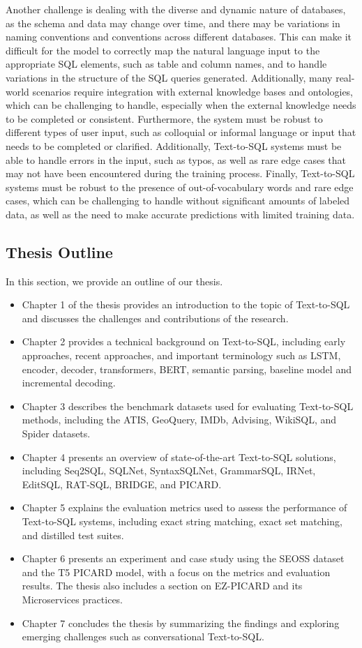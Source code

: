 Another challenge is dealing with the diverse and dynamic nature of databases, as the schema and data may change over time, and there may be variations in naming conventions and conventions across different databases. This can make it difficult for the model to correctly map the natural language input to the appropriate SQL elements, such as table and column names, and to handle variations in the structure of the SQL queries generated. Additionally, many real-world scenarios require integration with external knowledge bases and ontologies, which can be challenging to handle, especially when the external knowledge needs to be completed or consistent. Furthermore, the system must be robust to different types of user input, such as colloquial or informal language or input that needs to be completed or clarified. Additionally, Text-to-SQL systems must be able to handle errors in the input, such as typos, as well as rare edge cases that may not have been encountered during the training process. Finally, Text-to-SQL systems must be robust to the presence of out-of-vocabulary words and rare edge cases, which can be challenging to handle without significant amounts of labeled data, as well as the need to make accurate predictions with limited training data.

\subsection{Thesis Outline}

In this section, we provide an outline of our thesis.

\begin{itemize}
      \item Chapter 1 of the thesis provides an introduction to the topic of Text-to-SQL and discusses the challenges and contributions of the research.
      \item Chapter 2 provides a technical background on Text-to-SQL, including early approaches, recent approaches, and important terminology such as LSTM, encoder, decoder, transformers, BERT, semantic parsing, baseline model and incremental decoding.
      \item Chapter 3 describes the benchmark datasets used for evaluating Text-to-SQL methods, including the ATIS, GeoQuery, IMDb, Advising, WikiSQL, and Spider datasets.
      \item Chapter 4 presents an overview of state-of-the-art Text-to-SQL solutions, including Seq2SQL, SQLNet, SyntaxSQLNet, GrammarSQL, IRNet, EditSQL, RAT-SQL, BRIDGE, and PICARD.
      \item Chapter 5 explains the evaluation metrics used to assess the performance of Text-to-SQL systems, including exact string matching, exact set matching, and distilled test suites.
      \item Chapter 6 presents an experiment and case study using the SEOSS dataset and the T5 PICARD model, with a focus on the metrics and evaluation results. The thesis also includes a section on EZ-PICARD and its Microservices practices.
      \item Chapter 7 concludes the thesis by summarizing the findings and exploring emerging challenges such as conversational Text-to-SQL.
\end{itemize}
